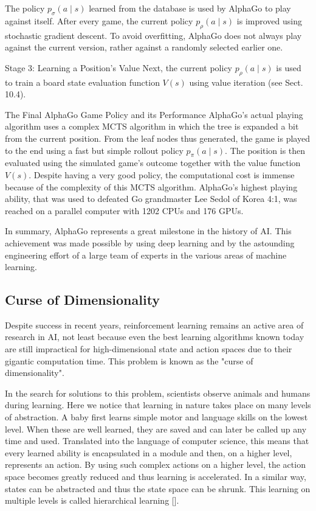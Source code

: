 \documentclass[10pt]{book}
\begin{document}
The policy $p_{\sigma}(a \mid s)$ learned from the database is used by AlphaGo to play against itself. After every game, the current policy $p_{\rho}(a \mid s)$ is improved using stochastic gradient descent. To avoid overfitting, AlphaGo does not always play against the current version, rather against a randomly selected earlier one.

Stage 3: Learning a Position's Value Next, the current policy $p_{\rho}(a \mid s)$ is used to train a board state evaluation function $V(s)$ using value iteration (see Sect. 10.4).

The Final AlphaGo Game Policy and its Performance AlphaGo's actual playing algorithm uses a complex MCTS algorithm in which the tree is expanded a bit from the current position. From the leaf nodes thus generated, the game is played to the end using a fast but simple rollout policy $p_{\pi}(a \mid s)$. The position is then evaluated using the simulated game's outcome together with the value function $V(s)$. Despite having a very good policy, the computational cost is immense because of the complexity of this MCTS algorithm. AlphaGo's highest playing ability, that was used to defeated Go grandmaster Lee Sedol of Korea 4:1, was reached on a parallel computer with 1202 CPUs and 176 GPUs.

In summary, AlphaGo represents a great milestone in the history of AI. This achievement was made possible by using deep learning and by the astounding engineering effort of a large team of experts in the various areas of machine learning.

\subsection{Curse of Dimensionality}
Despite success in recent years, reinforcement learning remains an active area of research in AI, not least because even the best learning algorithms known today are still impractical for high-dimensional state and action spaces due to their gigantic computation time. This problem is known as the "curse of dimensionality".

In the search for solutions to this problem, scientists observe animals and humans during learning. Here we notice that learning in nature takes place on many levels of abstraction. A baby first learns simple motor and language skills on the lowest level. When these are well learned, they are saved and can later be called up any time and used. Translated into the language of computer science, this means that every learned ability is encapsulated in a module and then, on a higher level, represents an action. By using such complex actions on a higher level, the action space becomes greatly reduced and thus learning is accelerated. In a similar way, states can be abstracted and thus the state space can be shrunk. This learning on multiple levels is called hierarchical learning [\cite{barto2003hierarchical}].
\end{document}
